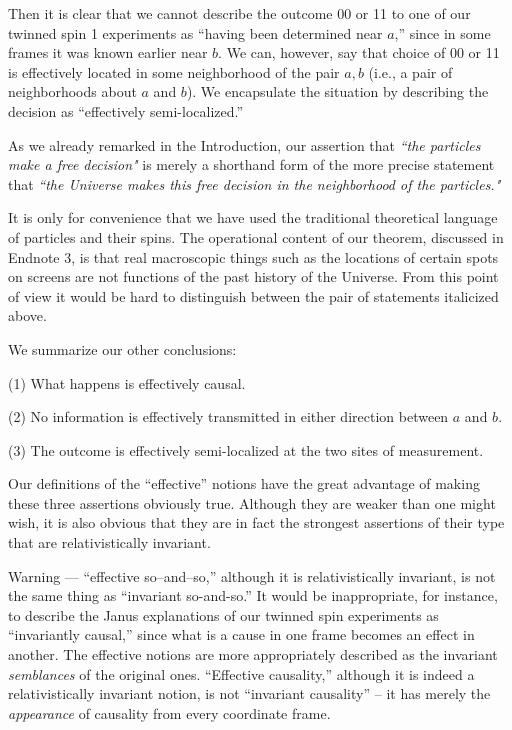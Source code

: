 \documentclass[12pt]{amsart}
\begin{document}
Then it is clear that we cannot describe the outcome 00 or 11 to 
one of our twinned spin 1 experiments as 
``having been determined near $a$,'' since in some frames it was
known earlier near $b$.  We can, however, say that choice of
00 or 11 is effectively located in some neighborhood of the pair $a,b$ 
(i.e., a pair of neighborhoods about $a$ and $b$).  
We encapsulate the situation by describing the decision as  ``effectively semi-localized.''  

As we already remarked in the Introduction, our assertion that 
 {\em ``the particles make a free decision"}
is merely a shorthand form of the more precise statement that 
 {\em ``the Universe makes this free decision in the neighborhood of the particles."}

It is only for convenience that we have used the traditional theoretical language of
particles and their spins.  The operational content of our theorem, discussed in
Endnote 3,  is that real macroscopic things such as the locations of certain spots on screens are not functions of the past history of the Universe.  From this point of
view it would be hard to distinguish between the pair of statements italicized above.      

 We summarize our other conclusions:
{\em

(1) What happens is effectively causal.
   
(2) No information is effectively transmitted in either 
direction between $a$ and $b$.  

(3) The outcome is effectively semi-localized at the two sites 
of measurement.}

Our definitions of the ``effective'' notions have the great advantage 
of making these three assertions obviously true.  Although they are 
weaker than one might wish, it is also obvious that they are in fact the
strongest assertions of their type that are relativistically invariant.

   Warning --- ``effective so--and--so,'' although it is relativistically 
invariant, is not the same thing as ``invariant so-and-so.''
It would be inappropriate, for instance, to describe the Janus 
explanations of our twinned spin experiments as ``invariantly causal,'' 
since what is a cause in one frame becomes an effect in another. 
The effective notions are more appropriately described as the invariant 
{\em semblances} of the original ones. ``Effective causality,'' 
although it is indeed a relativistically invariant notion, is not 
``invariant causality'' -- it has merely the {\em appearance} of 
causality from every coordinate frame.
\end{document}
